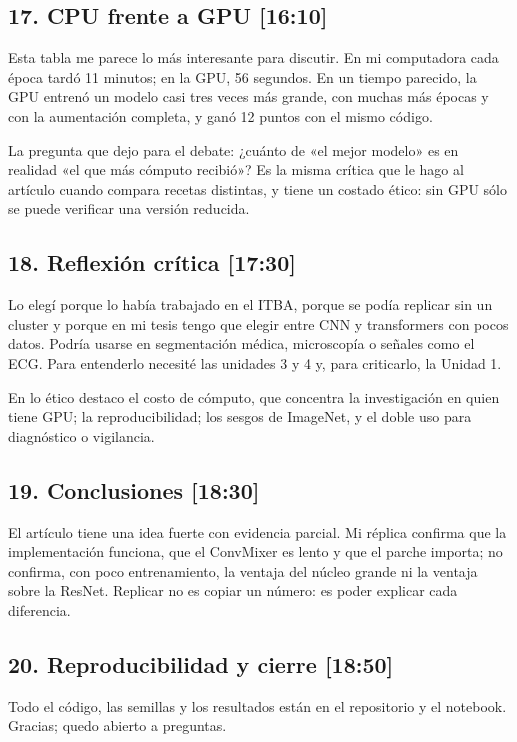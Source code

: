 \documentclass[11pt,a4paper]{article}
\begin{document}
\subsection{17. CPU frente a GPU \hfill \normalfont\small [16:10]}
Esta tabla me parece lo más interesante para discutir. En mi computadora cada época tardó 11 minutos; en la GPU, 56 segundos. En un tiempo parecido, la GPU entrenó un modelo casi tres veces más grande, con muchas más épocas y con la aumentación completa, y ganó 12 puntos con el mismo código.

La pregunta que dejo para el debate: ¿cuánto de «el mejor modelo» es en realidad «el que más cómputo recibió»? Es la misma crítica que le hago al artículo cuando compara recetas distintas, y tiene un costado ético: sin GPU sólo se puede verificar una versión reducida.

\subsection{18. Reflexión crítica \hfill \normalfont\small [17:30]}
Lo elegí porque lo había trabajado en el ITBA, porque se podía replicar sin un cluster y porque en mi tesis tengo que elegir entre CNN y transformers con pocos datos. Podría usarse en segmentación médica, microscopía o señales como el ECG. Para entenderlo necesité las unidades 3 y 4 y, para criticarlo, la Unidad 1.

En lo ético destaco el costo de cómputo, que concentra la investigación en quien tiene GPU; la reproducibilidad; los sesgos de ImageNet, y el doble uso para diagnóstico o vigilancia.

\subsection{19. Conclusiones \hfill \normalfont\small [18:30]}
El artículo tiene una idea fuerte con evidencia parcial. Mi réplica confirma que la implementación funciona, que el ConvMixer es lento y que el parche importa; no confirma, con poco entrenamiento, la ventaja del núcleo grande ni la ventaja sobre la ResNet. Replicar no es copiar un número: es poder explicar cada diferencia.

\subsection{20. Reproducibilidad y cierre \hfill \normalfont\small [18:50]}
Todo el código, las semillas y los resultados están en el repositorio y el notebook. Gracias; quedo abierto a preguntas.
\end{document}

